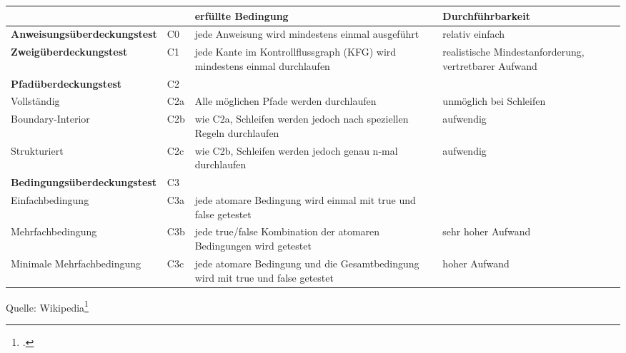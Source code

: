 \documentclass{lehramt-informatik}
\begin{document}
{
\footnotesize
\noindent
\begin{tabular}{llL{4cm}L{3cm}}
&
&
\textbf{erfüllte Bedingung} &
\textbf{Durchführbarkeit}
\\

\hline

%

\textbf{Anweisungsüberdeckungstest}
&
C0 &
jede Anweisung wird mindestens einmal ausgeführt &
relativ einfach \\

\hline

%

\textbf{Zweigüberdeckungstest} &
C1 &
jede Kante im Kontrollflussgraph (KFG) wird mindestens einmal durchlaufen &
realistische Mindestanforderung, vertretbarer Aufwand \\

\hline

%

\textbf{Pfadüberdeckungstest} &
C2 &
&
\\

Vollständig &
C2a &
Alle möglichen Pfade werden durchlaufen &
unmöglich bei Schleifen \\

Boundary-Interior &
C2b &
wie C2a, Schleifen werden jedoch nach speziellen Regeln durchlaufen &
aufwendig \\

Strukturiert &
C2c &
wie C2b, Schleifen werden jedoch genau n-mal durchlaufen &
aufwendig \\

\hline

%

\textbf{Bedingungsüberdeckungstest} &
C3 &
&
\\

Einfachbedingung &
C3a &
jede atomare Bedingung wird einmal mit true und false getestet &
\\

Mehrfachbedingung &
C3b &
jede true/false Kombination der atomaren Bedingungen wird getestet &
sehr hoher Aufwand \\

Minimale Mehrfachbedingung &
C3c &
jede atomare Bedingung und die Gesamtbedingung wird mit true und false getestet &
hoher Aufwand\\
\end{tabular}

Quelle: Wikipedia\footcite{wiki:kontrollfluss-test}
}

%
\end{document}
